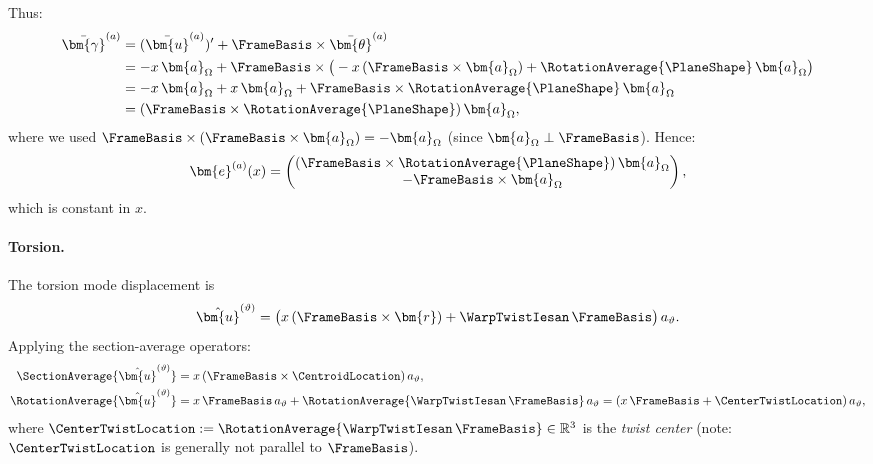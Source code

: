 Thus:
\begin{align*}
\bar{\bm{\gamma}}^{(a)} &= (\bar{\bm{u}}^{(a)})' + \FrameBasis \times \bar{\bm{\theta}}^{(a)} \\
&= -x\,\bm{a}_\Omega + \FrameBasis \times \big( -x\,(\FrameBasis \times \bm{a}_\Omega) + \RotationAverage{\PlaneShape}\,\bm{a}_\Omega \big) \\
&= -x\,\bm{a}_\Omega + x\,\bm{a}_\Omega + \FrameBasis \times \RotationAverage{\PlaneShape}\,\bm{a}_\Omega \\
&= (\FrameBasis \times \RotationAverage{\PlaneShape})\,\bm{a}_\Omega,
\end{align*}
where we used $\FrameBasis \times (\FrameBasis \times \bm{a}_\Omega) = -\bm{a}_\Omega$ 
(since $\bm{a}_\Omega \perp \FrameBasis$). 
Hence:
\begin{equation*}
\bm{e}^{(a)}(x) = \begin{pmatrix} (\FrameBasis \times \RotationAverage{\PlaneShape})\,\bm{a}_\Omega \\ 
-\FrameBasis \times \bm{a}_\Omega \end{pmatrix},
\end{equation*}
which is constant in $x$.

\paragraph{Torsion.}

The torsion mode displacement is
\begin{equation*}
\hat{\bm{u}}^{(\vartheta)} = \big( x\,(\FrameBasis \times \bm{r}) + \WarpTwistIesan\,\FrameBasis \big)\,a_\vartheta.
\end{equation*}
Applying the section-average operators:
\begin{align*}
\SectionAverage{\hat{\bm{u}}^{(\vartheta)}} &= x\,(\FrameBasis \times \CentroidLocation)\,a_\vartheta, \\
\RotationAverage{\hat{\bm{u}}^{(\vartheta)}} &= x\,\FrameBasis\,a_\vartheta + \RotationAverage{\WarpTwistIesan\,\FrameBasis}\,a_\vartheta 
= (x\,\FrameBasis + \CenterTwistLocation)\,a_\vartheta,
\end{align*}
where $\CenterTwistLocation := \RotationAverage{\WarpTwistIesan\,\FrameBasis} \in \mathbb{R}^3$ 
is the \emph{twist center} (note: $\CenterTwistLocation$ is generally not parallel to $\FrameBasis$).

